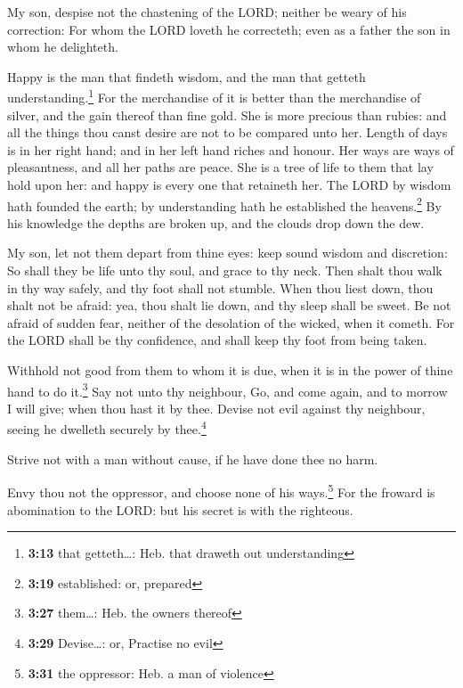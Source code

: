  My son, despise not the chastening of the LORD; neither
be weary of his correction:  For whom the LORD loveth he
correcteth; even as a father the son in whom he delighteth.

 Happy is the man that findeth wisdom, and the man that
getteth understanding.\footnote{\textbf{3:13} that getteth\ldots: Heb.
  that draweth out understanding}  For the merchandise of
it is better than the merchandise of silver, and the gain thereof than
fine gold.  She is more precious than rubies: and all the
things thou canst desire are not to be compared unto her.
 Length of days is in her right hand; and in her left
hand riches and honour.  Her ways are ways of
pleasantness, and all her paths are peace.  She is a tree
of life to them that lay hold upon her: and happy is every one that
retaineth her.  The LORD by wisdom hath founded the
earth; by understanding hath he established the heavens.\footnote{\textbf{3:19}
  established: or, prepared}  By his knowledge the depths
are broken up, and the clouds drop down the dew.

 My son, let not them depart from thine eyes: keep sound
wisdom and discretion:  So shall they be life unto thy
soul, and grace to thy neck.  Then shalt thou walk in thy
way safely, and thy foot shall not stumble.  When thou
liest down, thou shalt not be afraid: yea, thou shalt lie down, and thy
sleep shall be sweet.  Be not afraid of sudden fear,
neither of the desolation of the wicked, when it cometh. 
For the LORD shall be thy confidence, and shall keep thy foot from being
taken.

 Withhold not good from them to whom it is due, when it
is in the power of thine hand to do it.\footnote{\textbf{3:27}
  them\ldots: Heb. the owners thereof}  Say not unto thy
neighbour, Go, and come again, and to morrow I will give; when thou hast
it by thee.  Devise not evil against thy neighbour,
seeing he dwelleth securely by thee.\footnote{\textbf{3:29}
  Devise\ldots: or, Practise no evil}

 Strive not with a man without cause, if he have done
thee no harm.

 Envy thou not the oppressor, and choose none of his
ways.\footnote{\textbf{3:31} the oppressor: Heb. a man of violence}
 For the froward is abomination to the LORD: but his
secret is with the righteous.

